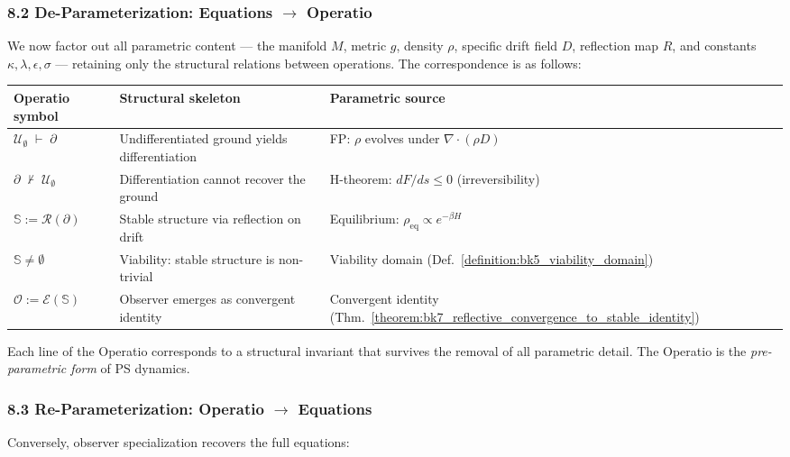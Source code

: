 \subsubsection*{8.2 De-Parameterization: Equations $\to$ Operatio}

We now factor out all parametric content --- the manifold $M$, metric $g$,
density $\rho$, specific drift field $D$, reflection map $R$, and constants
$\kappa, \lambda, \epsilon, \sigma$ --- retaining only the structural
relations between operations. The correspondence is as follows:

\begin{center}
\renewcommand{\arraystretch}{1.3}
\begin{tabularx}{\textwidth}{@{}lYY@{}}
\toprule
\textbf{Operatio symbol} & \textbf{Structural skeleton} & \textbf{Parametric source} \\
\midrule
$\mathcal{U}_{\emptyset} \;\vdash\; \partial$
& Undifferentiated ground yields differentiation
& FP: $\rho$ evolves under $\nabla \cdot (\rho D)$ \\
$\partial \;\nvdash\; \mathcal{U}_{\emptyset}$
& Differentiation cannot recover the ground
& H-theorem: $dF/ds \leq 0$ (irreversibility) \\
$\mathbb{S} := \mathcal{R}(\partial)$
& Stable structure via reflection on drift
& Equilibrium: $\rho_{\mathrm{eq}} \propto e^{-\beta H}$ \\
$\mathbb{S} \neq \emptyset$
& Viability: stable structure is non-trivial
& Viability domain
(Def.~\ref{definition:bk5_viability_domain}) \\
$\mathcal{O} := \mathcal{E}(\mathbb{S})$
& Observer emerges as convergent identity
& Convergent identity
(Thm.~\ref{theorem:bk7_reflective_convergence_to_stable_identity}) \\
\bottomrule
\end{tabularx}
\end{center}

\noindent
Each line of the Operatio corresponds to a structural invariant that survives
the removal of all parametric detail. The Operatio is the
\emph{pre-parametric form} of PS dynamics.

\subsubsection*{8.3 Re-Parameterization: Operatio $\to$ Equations}

Conversely, observer specialization recovers the full equations:

